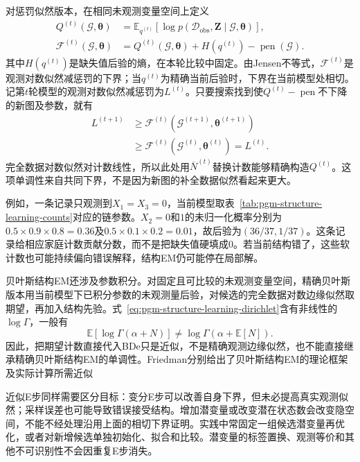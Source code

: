 对惩罚似然版本，在相同未观测变量空间上定义
\begin{equation}
  \begin{aligned}
    Q^{(t)}(\mathcal{G},\bm{\theta})
      &=\mathbb{E}_{q^{(t)}}[
          \log p(\mathcal{D}_{\mathrm{obs}},\bm{Z}
                     \mid\mathcal{G},\bm{\theta})],\\
    \mathcal{F}^{(t)}(\mathcal{G},\bm{\theta})
      &=Q^{(t)}(\mathcal{G},\bm{\theta})+H(q^{(t)})
        -\operatorname{pen}(\mathcal{G}).
  \end{aligned}
  \label{eq:pgm-structure-learning-sem-bound}
\end{equation}
其中$H(q^{(t)})$是缺失值后验的熵，在本轮比较中固定。由Jensen不等式，$\mathcal{F}^{(t)}$是观测对数似然减惩罚的下界；当$q^{(t)}$为精确当前后验时，下界在当前模型处相切。记第$t$轮模型的观测对数似然减惩罚为$L^{(t)}$。只要搜索找到使$Q^{(t)}-\operatorname{pen}$不下降的新图及参数，就有
\[
  \begin{aligned}
    L^{(t+1)}
    &\geq \mathcal{F}^{(t)}(\mathcal{G}^{(t+1)},\bm{\theta}^{(t+1)})\\
    &\geq \mathcal{F}^{(t)}(\mathcal{G}^{(t)},\bm{\theta}^{(t)})
     =L^{(t)}.
  \end{aligned}
\]
完全数据对数似然对计数线性，所以此处用$\overline N^{(t)}$替换计数能够精确构造$Q^{(t)}$。这项单调性来自共同下界，不是因为新图的补全数据似然看起来更大。

例如，一条记录只观测到$X_1=X_3=0$，当前模型取表~\ref{tab:pgm-structure-learning-counts}对应的链参数。$X_2=0$和$1$的未归一化概率分别为$0.5\times0.9\times0.8=0.36$及$0.5\times0.1\times0.2=0.01$，故后验为$(36/37,1/37)$。这条记录给相应家庭计数贡献分数，而不是把缺失值硬填成$0$。若当前结构错了，这些软计数也可能持续偏向错误解释，结构EM仍可能停在局部解。

贝叶斯结构EM还涉及参数积分。对固定且可比较的未观测变量空间，精确贝叶斯版本用当前模型下已积分参数的未观测量后验，对候选的完全数据对数边缘似然取期望，再加入结构先验。式~\eqref{eq:pgm-structure-learning-dirichlet}含有非线性的$\log\Gamma$，一般有
\[
  \mathbb{E}[\log\Gamma(\alpha+N)]
  \ne\log\Gamma(\alpha+\mathbb{E}[N]).
\]
因此，把期望计数直接代入BDe只是近似，不是精确观测边缘似然，也不能直接继承精确贝叶斯结构EM的单调性。Friedman分别给出了贝叶斯结构EM的理论框架及实际计算所需近似

近似E步同样需要区分目标：变分E步可以改善自身下界，但未必提高真实观测似然；采样误差也可能导致错误接受结构。增加潜变量或改变潜在状态数会改变隐空间，不能不经处理沿用上面的相切下界证明。实践中常固定一组候选潜变量再优化，或者对新增候选单独初始化、拟合和比较。潜变量的标签置换、观测等价和其他不可识别性不会因重复E步消失。

